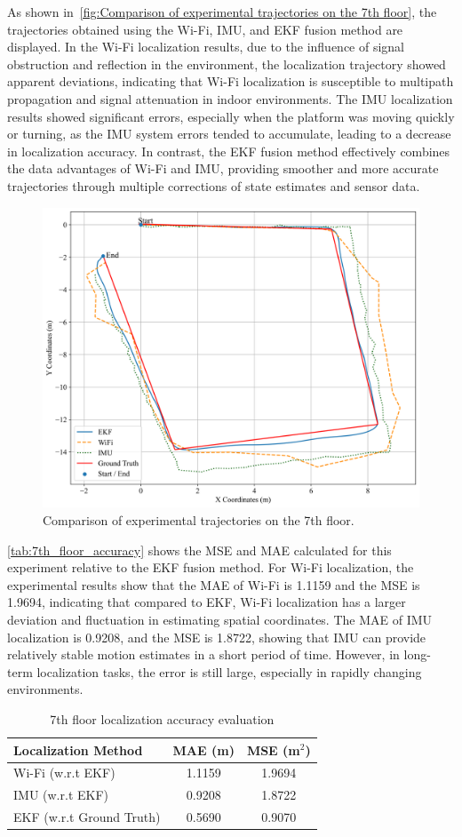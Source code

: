 \documentclass[12pt,a4paper]{article}
\numberwithin{equation}{section}
\begin{document}
As shown in~\autoref{fig:Comparison of experimental trajectories on the 7th
  floor}, the trajectories obtained using the Wi-Fi, IMU, and EKF fusion method
are displayed. In the Wi-Fi localization results, due to the influence of signal
obstruction and reflection in the environment, the localization trajectory
showed apparent deviations, indicating that Wi-Fi localization is susceptible to
multipath propagation and signal attenuation in indoor environments. The IMU
localization results showed significant errors, especially when the platform was
moving quickly or turning, as the IMU system errors tended to accumulate,
leading to a decrease in localization accuracy. In contrast, the EKF fusion
method effectively combines the data advantages of Wi-Fi and IMU, providing
smoother and more accurate trajectories through multiple corrections of state
estimates and sensor data.
\begin{figure}[H]
  \centering
  \includegraphics[width=0.7\linewidth]{images/1/2.png}
  \caption{Comparison of experimental trajectories on the 7th floor.}
  \label{fig:Comparison of experimental trajectories on the 7th floor}
\end{figure}

\autoref{tab:7th_floor_accuracy} shows the MSE and MAE calculated for this
experiment relative to the EKF fusion method. For Wi-Fi localization, the
experimental results show that the MAE of Wi-Fi is 1.1159 and the MSE is 1.9694,
indicating that compared to EKF, Wi-Fi localization has a larger deviation and
fluctuation in estimating spatial coordinates. The MAE of IMU localization is
0.9208, and the MSE is 1.8722, showing that IMU can provide relatively stable
motion estimates in a short period of time. However, in long-term localization
tasks, the error is still large, especially in rapidly changing environments.
\begin{table}[H]
  \centering
  \caption{7th floor localization accuracy evaluation}
  \label{tab:7th_floor_accuracy}
  \begin{tabular}{lcc}
    \toprule
    \textbf{Localization Method} & \textbf{MAE (m)} & \textbf{MSE (m$^2$)} \\
    \midrule
    Wi-Fi (w.r.t EKF) & 1.1159 & 1.9694 \\
    IMU (w.r.t EKF)   & 0.9208 & 1.8722 \\
    EKF (w.r.t Ground Truth)    & 0.5690 & 0.9070 \\
    \bottomrule
  \end{tabular}
\end{table}
\end{document}
